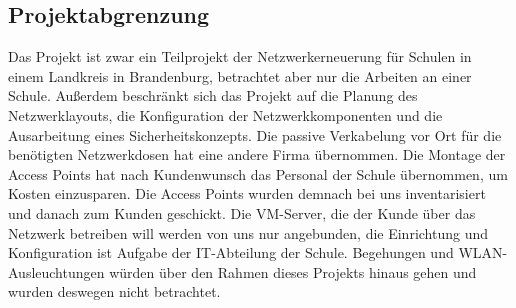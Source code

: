 \subsection{Projektabgrenzung} 
\label{sec:Projektabgrenzung}
Das Projekt ist zwar ein Teilprojekt der Netzwerkerneuerung für Schulen in einem Landkreis in Brandenburg, betrachtet aber nur die Arbeiten an einer Schule. 
Außerdem beschränkt sich das Projekt auf die Planung des Netzwerklayouts, die Konfiguration der Netzwerkkomponenten und die Ausarbeitung eines Sicherheitskonzepts. 
Die passive Verkabelung vor Ort für die benötigten Netzwerkdosen hat eine andere Firma übernommen. 
Die Montage der Access Points hat nach Kundenwunsch das Personal der Schule übernommen, um Kosten einzusparen. 
Die Access Points wurden demnach bei uns inventarisiert und danach zum Kunden geschickt. Die VM-Server, die der Kunde über das Netzwerk betreiben will werden von uns nur angebunden, die Einrichtung und Konfiguration ist Aufgabe der IT-Abteilung der Schule.
Begehungen und WLAN-Ausleuchtungen würden über den Rahmen dieses Projekts hinaus gehen und wurden deswegen nicht betrachtet.
\begin{comment}
	\item Was ist explizit nicht Teil des Projekts (\insb bei Teilprojekten)?
\end{comment}

